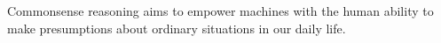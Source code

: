 Commonsense reasoning aims to empower machines with the human ability to make presumptions about ordinary situations in our daily life.